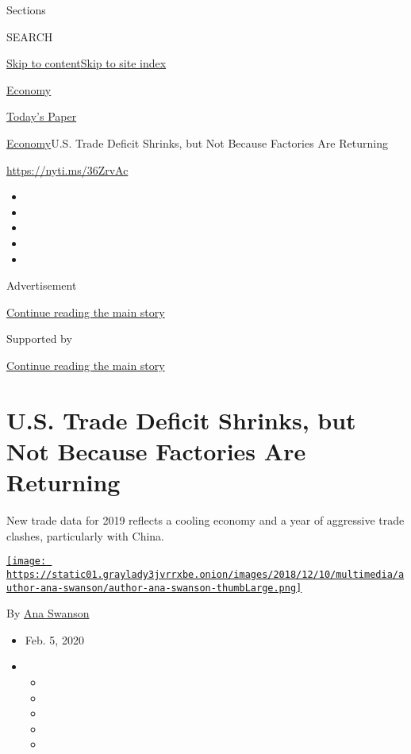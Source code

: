 Sections

SEARCH

\protect\hyperlink{site-content}{Skip to
content}\protect\hyperlink{site-index}{Skip to site index}

\href{https://www.nytimes3xbfgragh.onion/section/business/economy}{Economy}

\href{https://myaccount.nytimes3xbfgragh.onion/auth/login?response_type=cookie\&client_id=vi}{}

\href{https://www.nytimes3xbfgragh.onion/section/todayspaper}{Today's
Paper}

\href{/section/business/economy}{Economy}\textbar{}U.S. Trade Deficit
Shrinks, but Not Because Factories Are Returning

\url{https://nyti.ms/36ZrvAc}

\begin{itemize}
\item
\item
\item
\item
\item
\end{itemize}

Advertisement

\protect\hyperlink{after-top}{Continue reading the main story}

Supported by

\protect\hyperlink{after-sponsor}{Continue reading the main story}

\hypertarget{us-trade-deficit-shrinks-but-not-because-factories-are-returning}{%
\section{U.S. Trade Deficit Shrinks, but Not Because Factories Are
Returning}\label{us-trade-deficit-shrinks-but-not-because-factories-are-returning}}

New trade data for 2019 reflects a cooling economy and a year of
aggressive trade clashes, particularly with China.

\href{https://www.nytimes3xbfgragh.onion/by/ana-swanson}{\texttt{[image: https://static01.graylady3jvrrxbe.onion/images/2018/12/10/multimedia/author-ana-swanson/author-ana-swanson-thumbLarge.png]}}

By \href{https://www.nytimes3xbfgragh.onion/by/ana-swanson}{Ana Swanson}

\begin{itemize}
\item
  Feb. 5, 2020
\item
  \begin{itemize}
  \item
  \item
  \item
  \item
  \item
  \end{itemize}
\end{itemize}

